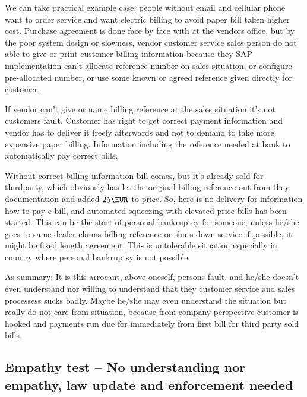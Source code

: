 We can take practical example case; people without email and cellular phone
want to order service and want electric billing to avoid paper bill taken
higher cost. Purchase agreement is done face by face with at the vendors
office, but by the poor system design or slowness, vendor customer service
sales person do not able to give or print customer billing information because
they SAP implementation can't allocate reference number on sales situation, or
configure pre-allocated number, or use some known or agreed reference given
directly for customer.

If vendor can't give or name billing reference at the sales situation it's not
customers fault. Customer has right to get correct payment information and
vendor has to deliver it freely afterwards and not to demand to take more
expensive paper billing. Information including the reference needed at bank to
automatically pay correct bills.

Without correct billing information bill comes, but it's already sold for
thirdparty, which obviously has let the original billing reference out from
they documentation and added $25\EUR$ to price. So, here is no delivery for
information how to pay e-bill, and automated squeezing with elevated price
bills has been started. This can be the start of personal bankruptcy for
someone, unless he/she goes to same dealer claims billing reference or shuts
down service if possible, it might be fixed length agreement. This is
untolerable situation especially in country where personal bankruptsy is not
possible.

As summary: It is this arrocant, above oneself, persons fault, and he/she
doesn't even understand nor willing to understand that they customer service
and sales processess sucks badly. Maybe he/she may even understand the
situation but really do not care from situation, because from company
perspective customer is hooked and payments run due for immediately from
first bill for third party sold bills.

\subsection{Empathy test -- No understanding nor empathy, law update and enforcement needed}
\label{Empathy_test_fail_law_needed}

